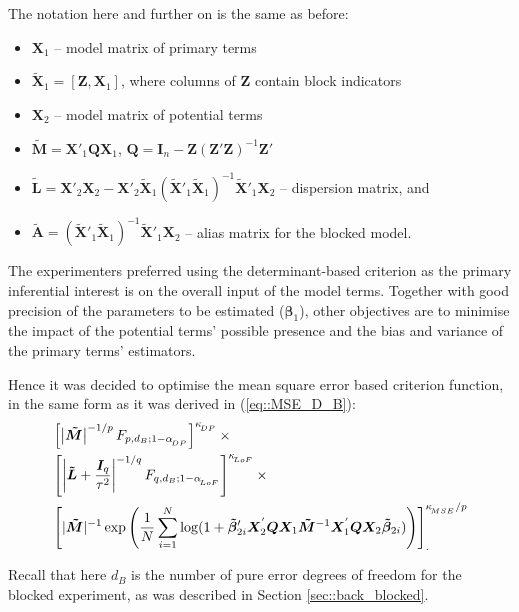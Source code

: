 The notation here and further on is the same as before:
\begin{itemize}
\item $\bm{X}_{1}$ -- model matrix of primary terms
\item $\bm{\tilde{X}}_{1}=[\bm{Z},\bm{X}_{1}]$, where columns of $\bm{Z}$ contain block indicators
\item $\bm{X}_{2}$ -- model matrix of potential terms
\item $\bm{\tilde{M}}=\bm{X}'_{1}\bm{Q}\bm{X}_{1}$, $\bm{Q}= \bm{I}_{n}-\bm{Z}(\bm{Z}'\bm{Z})^{-1}\bm{Z}'$
\item $\bm{\tilde{L}}=\bm{X}'_{2}\bm{X}_{2}-\bm{X}'_{2}\bm{\tilde{X}}_{1}(\bm{\tilde{X}}'_{1}\bm{\tilde{X}}_{1})^{-1}\bm{\tilde{X}}'_{1}\bm{X}_{2}$ -- dispersion matrix, and 
\item $\bm{\tilde{A}}= (\bm{\tilde{X}}'_{1}\bm{\tilde{X}}_{1})^{-1}\bm{\tilde{X}}'_{1}\bm{X}_{2}$ -- alias matrix for the blocked model.
\end{itemize}

The experimenters preferred using the determinant-based criterion as the primary inferential interest is on the overall input of the model terms. Together with good precision of the parameters to be estimated ($\bm{\beta}_1$), other objectives are to minimise the impact of the potential terms' possible presence and the bias and variance of the primary terms' estimators.
 
Hence it was decided to optimise the mean square error based criterion function, in the same form as it was derived in (\ref{eq::MSE_D_B}):
\begin{align}
\label{eq::crit1}
&\left[\left|\bm{\tilde{M}}\right|^{-1/p}F_{p,d_B;1-\alpha_{\!_{DP}}}\right]^{\kappa_{\!_{DP}}} \times \notag \\ &\left[\left|\bm{\tilde{L}}+\frac{\bm{I}_{q}}{\tau^{2}}\right|^{-1/q}F_{q,d_B;1-\alpha_{\!_{LoF}}}\right]^{\kappa_{\!_{LoF}}}\times \notag\\ & \left[|\bm{\tilde{M}}|^{-1}\exp\left(\frac{1}{N}\sum_{i=1}^{N}\log(1+\bm{\tilde{\beta}}_{2i}'\bm{X}_2^{'}\bm{Q}\bm{X}_1\bm{\tilde{M}}^{-1}\bm{X}_1^{'}\bm{Q}\bm{X}_2\bm{\tilde{\beta}}_{2i})\right)\right]_{.}^{\kappa_{\!_{MSE}}/p}
\end{align}

Recall that here $d_B$ is the number of pure error degrees of freedom for the blocked experiment, as was described in Section \ref{sec::back_blocked}. 

